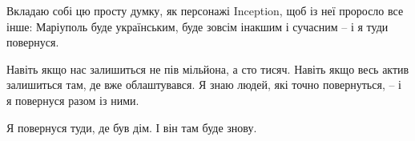 Вкладаю собі цю просту думку, як персонажі Inception, щоб із неї проросло все
інше: Маріуполь буде українським, буде зовсім інакшим і сучасним – і я туди
повернуся.

Навіть якщо нас залишиться не пів мільйона, а сто тисяч. Навіть якщо весь актив
залишиться там, де вже облаштувався. Я знаю людей, які точно повернуться, – і я
повернуся разом із ними.

Я повернуся туди, де був дім. І він там буде знову.

